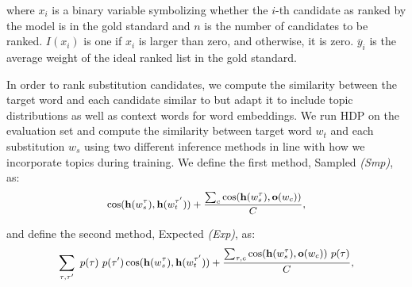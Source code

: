 \noindent where $x_i$ is a binary variable symbolizing whether the $i$-th candidate as ranked by the model is in the gold standard and $n$ is the number of candidates to be ranked. 
$I(x_i)$ is one if $x_i$ is larger than zero, and otherwise, it is zero. 
$\overline{y}_i$ is the average weight of the ideal ranked list in the gold standard.


In order to rank substitution candidates, we compute the similarity between the target word and each candidate similar to \citet{melamud2015simple} but adapt it to include topic distributions as well as context words for word embeddings. 
We run HDP on the evaluation set %
and compute the similarity between target word $w_t$ and each substitution $w_s$ using two different inference methods in line with how we incorporate topics during training.
We define the first method, Sampled \textit{(Smp)}, as:
\begin{equation}
\small
\cos(\bm{\mathbf{h}}(w_s^\tau), \bm{\mathbf{h}}(w_t^{\tau'})) +  \frac{\sum_{c}  \cos(\bm{\mathbf{h}}(w_s^{\tau}), \bm{\mathbf{o}}(w_c)) }{C},  
 \end{equation}
 
\noindent 
and define the second method, Expected \textit{(Exp)}, as:
\begin{equation}
\small
\begin{split}
\sum_{\tau, \tau'}  \ p(\tau) \ p(\tau') \cos(\bm{\mathbf{h}}(w_s^\tau), \bm{\mathbf{h}}(w_t^{\tau'})) +  \frac{\sum_{\tau,c}  \cos(\bm{\mathbf{h}}(w_s^{\tau}), \bm{\mathbf{o}}(w_c)) \ p(\tau) }{C},  
\end{split}
\end{equation}

